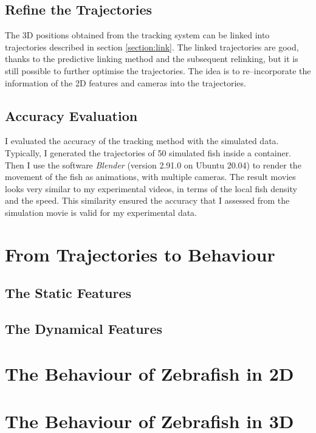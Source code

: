 \documentclass[11pt,twoside]{report}
\begin{document}
\subsection{Refine the Trajectories}

The 3D positions obtained from the tracking system can be linked into trajectories described in section \ref{section:link}. The linked trajectories are good, thanks to the predictive linking method and the subsequent relinking, but it is still possible to further optimise the trajectories. The idea is to re--incorporate the information of the 2D features and cameras into the trajectories.

\subsection{Accuracy Evaluation}

I evaluated the accuracy of the tracking method with the simulated data. Typically, I generated the trajectories of 50 simulated fish inside a container. Then I use the software \emph{Blender} (version 2.91.0 on Ubuntu 20.04) to render the movement of the fish as animations, with multiple cameras. The result movies looks very similar to my experimental videos, in terms of the local fish density and the speed. This similarity ensured the accuracy that I assessed from the simulation movie is valid for my experimental data.


\section{From Trajectories to Behaviour}

\subsection{The Static Features}

\subsection{The Dynamical Features}


\section{The Behaviour of Zebrafish in 2D}


\section{The Behaviour of Zebrafish in 3D}
\end{document}
